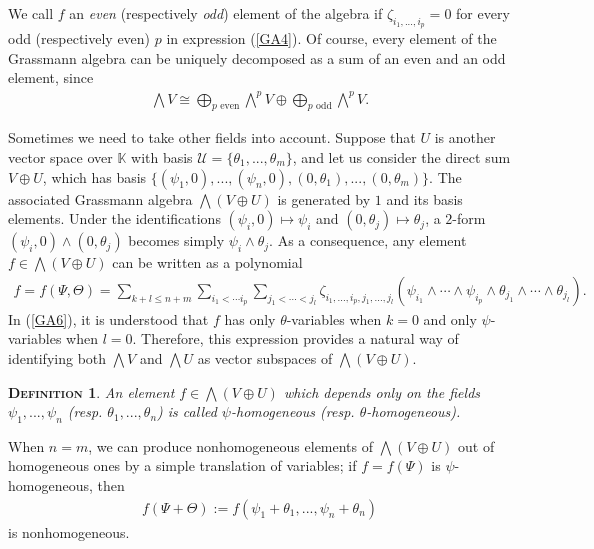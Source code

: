 \documentclass[12pt,twoside]{amsart}
\newtheorem{defi}{\textsc{Definition}}[section]
\numberwithin{equation}{section}
\begin{document}
We call $f$ an \textit{even} (respectively \textit{odd}) element of the algebra if $\zeta_{i_{1},...,i_{p}} = 0$ for every odd (respectively even) $p$ in expression (\ref{GA4}). Of course, every element of the Grassmann algebra can be uniquely decomposed as a sum of an even and an odd element, since
\begin{eqnarray}
\bigwedge V \cong \bigoplus_{\text{$p$ even}}\bigwedge^{p}V \oplus \bigoplus_{\text{$p$ odd}}\bigwedge^{p}V. \nonumber
\end{eqnarray}

Sometimes we need to take other fields into account. Suppose that $U$ is another vector space over $\mathbb{K}$ with basis $\mathcal{U} = \{\theta_{1},...,\theta_{m}\}$, and let us consider the direct sum $V\oplus U$, which has basis $\{(\psi_{1},0),...,(\psi_{n},0),(0,\theta_{1}),...,(0,\theta_{m})\}$. The associated Grassmann algebra $\bigwedge (V\oplus U)$ is generated by $1$ and its basis elements. Under the identifications $(\psi_{i},0) \mapsto \psi_{i}$ and $(0,\theta_{j}) \mapsto \theta_{j}$, a $2$-form $(\psi_{i},0)\wedge (0,\theta_{j})$ becomes simply $\psi_{i}\wedge \theta_{j}$. As a consequence, any element $f \in \bigwedge (V\oplus U)$ can be written as a polynomial
\begin{eqnarray}
f = f(\Psi,\Theta) = \sum_{k+l \le n+m}\sum_{i_{1}<\cdots i_{p}}\sum_{j_{1}<\cdots < j_{l}}\zeta_{i_{1},...,i_{p},j_{1},...,j_{l}}(\psi_{i_{1}}\wedge \cdots \wedge \psi_{i_{p}}\wedge \theta_{j_{1}}\wedge \cdots \wedge \theta_{j_{l}}). \label{GA6}
\end{eqnarray}
In (\ref{GA6}), it is understood that $f$ has only $\theta$-variables when $k=0$ and only $\psi$-variables when $l=0$. Therefore, this expression provides a natural way of identifying both $\bigwedge V$ and $\bigwedge U$ as vector subspaces of $\bigwedge (V\oplus U)$. 

\begin{defi}\label{homogeneouselement} An element $f \in \bigwedge (V\oplus U)$ which depends only on the fields $\psi_{1},...,\psi_{n}$ (resp. $\theta_{1},...,\theta_{n}$) is called $\psi$-homogeneous (resp. $\theta$-homogeneous).
\end{defi}

When $n=m$, we can produce nonhomogeneous elements of $\bigwedge (V\oplus U)$ out of homogeneous ones by a simple translation of variables; if $f = f(\Psi)$ is $\psi$-homogeneous, then
\begin{eqnarray}
f(\Psi+\Theta) := f(\psi_{1}+\theta_{1},...,\psi_{n}+\theta_{n}) \label{GA7}
\end{eqnarray}
is nonhomogeneous. 
\end{document}
